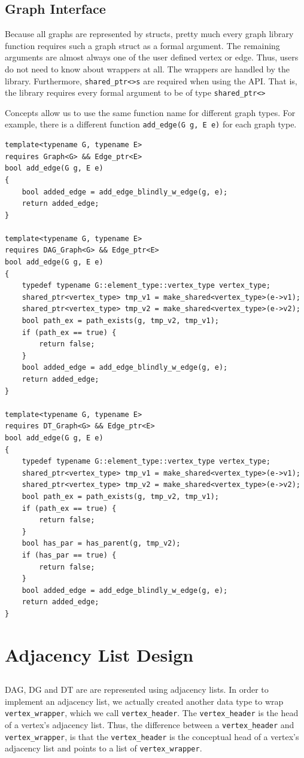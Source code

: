 \documentclass{article}
\begin{document}
\subsection{Graph Interface}
Because all graphs are represented by structs, pretty much every graph library function requires such a graph struct as a formal argument. The remaining arguments are almost always one of the user defined vertex or edge. Thus, users do not need to know about wrappers at all. The wrappers are handled by the library. Furthermore, \texttt{shared\_ptr<>s} are required when using the API. That is, the library requires every formal argument to be of type \texttt{shared\_ptr<>} 
\par
Concepts allow us to use the same function name for different graph types. For example, there is a different function \texttt{add\_edge(G g, E e)} for each graph type.
\begin{lstlisting}
template<typename G, typename E>
requires Graph<G> && Edge_ptr<E>
bool add_edge(G g, E e)
{
	bool added_edge = add_edge_blindly_w_edge(g, e);
	return added_edge;
}

template<typename G, typename E>
requires DAG_Graph<G> && Edge_ptr<E>
bool add_edge(G g, E e)
{
	typedef typename G::element_type::vertex_type vertex_type;
	shared_ptr<vertex_type> tmp_v1 = make_shared<vertex_type>(e->v1);
	shared_ptr<vertex_type> tmp_v2 = make_shared<vertex_type>(e->v2);
	bool path_ex = path_exists(g, tmp_v2, tmp_v1);
	if (path_ex == true) {
		return false;
	} 
	bool added_edge = add_edge_blindly_w_edge(g, e);
	return added_edge;
}

template<typename G, typename E>
requires DT_Graph<G> && Edge_ptr<E>
bool add_edge(G g, E e)
{
	typedef typename G::element_type::vertex_type vertex_type;
	shared_ptr<vertex_type> tmp_v1 = make_shared<vertex_type>(e->v1);
	shared_ptr<vertex_type> tmp_v2 = make_shared<vertex_type>(e->v2);
	bool path_ex = path_exists(g, tmp_v2, tmp_v1);
	if (path_ex == true) {
		return false;
	}
	bool has_par = has_parent(g, tmp_v2);
	if (has_par == true) {
		return false;
	}
	bool added_edge = add_edge_blindly_w_edge(g, e);
	return added_edge;
}
\end{lstlisting}

\section{Adjacency List Design}
\subsection{}
DAG, DG and DT are are represented using adjacency lists. In order to implement an adjacency list, we actually created another data type to wrap \texttt{vertex\_wrapper}, which we call \texttt{vertex\_header}. The \texttt{vertex\_header} is the head of a vertex's adjacency list. Thus, the difference between a \texttt{vertex\_header} and \texttt{vertex\_wrapper}, is that the \texttt{vertex\_header} is the conceptual head of a vertex's adjacency list and points to a list of \texttt{vertex\_wrapper}.
\end{document}
